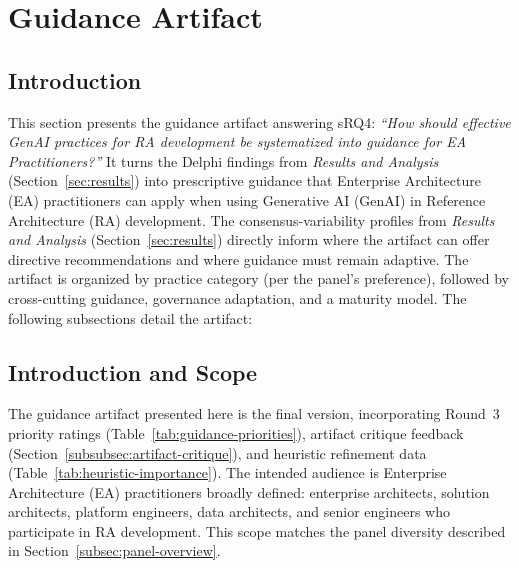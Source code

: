 
\section{Guidance Artifact}\label{sec:artifact}

\subsection*{Introduction}

This section presents the guidance artifact answering sRQ4: \textit{``How should
effective GenAI practices for RA development be systematized into guidance for EA
Practitioners?''} It turns the Delphi findings from
\textit{Results and Analysis} (Section~\ref{sec:results}) into prescriptive guidance that Enterprise
Architecture (EA) practitioners can apply when using Generative AI (GenAI) in
Reference Architecture (RA) development. The consensus-variability profiles
from \textit{Results and Analysis} (Section~\ref{sec:results}) directly inform where the artifact can offer
directive recommendations and where guidance must remain adaptive. The artifact
is organized by practice category (per the panel's preference), followed by
cross-cutting guidance, governance adaptation, and a maturity model. The
following subsections detail the artifact:

\localtableofcontents\clearpage

\subsection{Introduction and Scope}\label{subsec:artifact-scope}

The guidance artifact presented here is the final version, incorporating Round~3
priority ratings (Table~\ref{tab:guidance-priorities}), artifact critique
feedback (Section~\ref{subsubsec:artifact-critique}), and heuristic refinement
data (Table~\ref{tab:heuristic-importance}). The intended audience is Enterprise
Architecture (EA) practitioners broadly defined: enterprise architects, solution
architects, platform engineers, data architects, and senior engineers who
participate in RA development. This scope matches the panel diversity described
in Section~\ref{subsec:panel-overview}.

